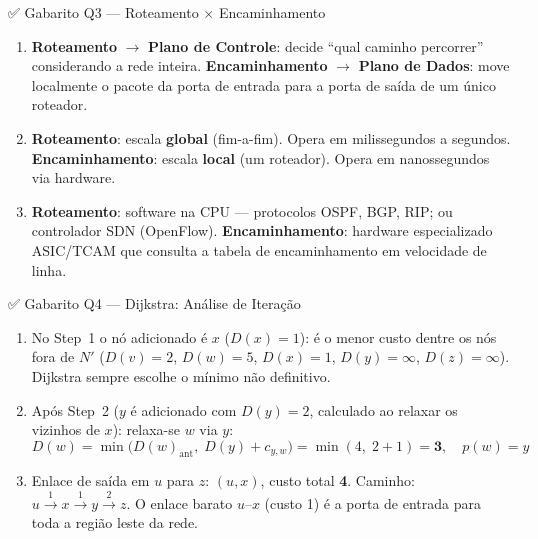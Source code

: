 \documentclass[11pt,a4paper]{article}
\begin{document}
\begin{gabaritocaixa}{✅ Gabarito Q3 --- Roteamento $\times$ Encaminhamento}
\begin{enumerate}[label=(\alph*)]
    \item \textbf{Roteamento} $\to$ \textbf{Plano de Controle}: decide ``qual caminho percorrer'' considerando a rede inteira. \textbf{Encaminhamento} $\to$ \textbf{Plano de Dados}: move localmente o pacote da porta de entrada para a porta de saída de um único roteador.
    \item \textbf{Roteamento}: escala \textbf{global} (fim-a-fim). Opera em milissegundos a segundos. \textbf{Encaminhamento}: escala \textbf{local} (um roteador). Opera em nanossegundos via hardware.
    \item \textbf{Roteamento}: software na CPU --- protocolos OSPF, BGP, RIP; ou controlador SDN (OpenFlow). \textbf{Encaminhamento}: hardware especializado ASIC/TCAM que consulta a tabela de encaminhamento em velocidade de linha.
\end{enumerate}
\end{gabaritocaixa}

\begin{gabaritocaixa}{✅ Gabarito Q4 --- Dijkstra: Análise de Iteração}
\begin{enumerate}[label=(\alph*)]
    \item No Step~1 o nó adicionado é \textbf{$x$} ($D(x)=1$): é o menor custo dentre os nós fora de $N'$ ($D(v)=2$, $D(w)=5$, $D(x)=1$, $D(y)=\infty$, $D(z)=\infty$). Dijkstra sempre escolhe o mínimo não definitivo.
    \item Após Step~2 ($y$ é adicionado com $D(y)=2$, calculado ao relaxar os vizinhos de $x$): relaxa-se $w$ via $y$:
    \[ D(w) = \min\!\bigl(D(w)_{\text{ant}},\; D(y)+c_{y,w}\bigr) = \min(4,\; 2+1) = \mathbf{3}, \quad p(w)=y \]
    \item Enlace de saída em $u$ para $z$: \textbf{$(u,x)$}, custo total \textbf{4}. Caminho: $u \xrightarrow{1} x \xrightarrow{1} y \xrightarrow{2} z$. O enlace barato $u$--$x$ (custo 1) é a porta de entrada para toda a região leste da rede.
\end{enumerate}
\end{gabaritocaixa}
\end{document}
